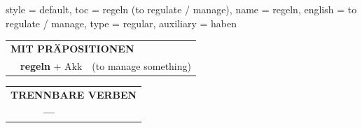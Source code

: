 \begin{verbentry}{
  style = {default},
  toc = {regeln (to regulate / manage)},
  name = {regeln},
  english = {to regulate / manage},
  type = {regular},
  auxiliary = {haben}
}
\vspace{10pt}

\begin{tabular}{lll}
\multicolumn{3}{l}{\textbf{MIT PRÄPOSITIONEN}}\\
& \textbf{regeln} + Akk & (to manage something)\\
\end{tabular}
\hfill
\begin{tabular}{lll}
\multicolumn{3}{l}{\textbf{TRENNBARE VERBEN}}\\
& \textbf{---} & \\
\end{tabular}

\vspace{-5pt}
\end{verbentry}

